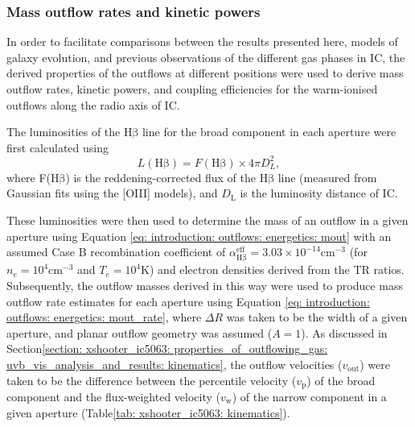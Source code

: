 \subsubsection{Mass outflow rates and kinetic powers}
\label{section: xshooter_ic5063: properties_of_outflowing_gas: uvb_vis_analysis_and_results: energetics}

In order to facilitate comparisons between the results presented here, models of galaxy evolution, and previous observations of the different gas phases in IC, the derived properties of the outflows at different positions were used to derive mass outflow rates, kinetic powers, and coupling efficiencies for the warm-ionised outflows along the radio axis of IC.

The luminosities of the H$\mathrm{\beta}$ line for the broad component in each aperture were first calculated using
\begin{equation}
L(\mathrm{H\beta}) = F(\mathrm{H\beta})\times 4\pi D^2_L,
\end{equation}
where F(H$\mathrm{\beta}$) is the reddening-corrected flux of the H$\mathrm{\beta}$ line (measured from Gaussian fits using the [OIII] models), and $D_\mathrm{L}$ is the luminosity distance of IC. 

These luminosities were then used to determine the mass of an outflow in a given aperture using Equation \ref{eq: introduction: outflows: energetics: mout} with an assumed Case B recombination coefficient of $\alpha^\mathrm{eff}_\mathrm{H\beta}=3.03\times10^{-14}$\;cm$^{-3}$ (for $n_e=10^4$\;cm$^{-3}$ and $T_e=10^4$\;K) and electron densities derived from the TR ratios. Subsequently, the outflow masses derived in this way were used to produce mass outflow rate estimates for each aperture using Equation \ref{eq: introduction: outflows: energetics: mout_rate}, where $\Delta{R}$ was taken to be the width of a given aperture, and planar outflow geometry was assumed ($A=1$). As discussed in Section\;\ref{section: xshooter_ic5063: properties_of_outflowing_gas: uvb_vis_analysis_and_results: kinematics}, the outflow velocities ($v_\mathrm{out}$) were taken to be the difference between the percentile velocity ($v_\mathrm{p}$) of the broad component and the flux-weighted velocity ($v_\mathrm{w}$) of the narrow component in a given aperture (Table\;\ref{tab: xshooter_ic5063: kinematics}). 


